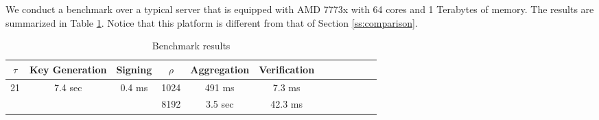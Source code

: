 We conduct a benchmark over a typical server that is equipped with AMD 7773x with
64 cores and 1 Terabytes of memory.
The results are summarized in Table \ref{tab:bench_results}.
Notice that this platform is different from that of Section \ref{ss:comparison}.

\begin{table}[t]\centering
  \begin{tabular}{|c|c||c||c|c|c|c|c|c||c|c|c|}\hline
      $\tau$              & Key Generation            & Signing                   & $\rho$  &  Aggregation & Verification  \\ \hline\hline
      \multirow{2}{*}{21} & \multirow{2}{*}{7.4 sec}  & \multirow{2}{*}{0.4 ms}   & 1024    &   491 ms     &  7.3 ms       \\\cline{4-6}
                          &                           &                           & 8192    &   3.5 sec    &  42.3 ms       \\\hline



  \end{tabular}\\
  \caption{Benchmark results}
  \label{tab:bench_results}
\end{table}

